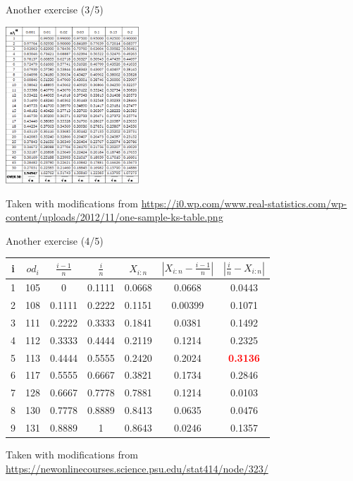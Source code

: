\documentclass{beamer}
\begin{document}
\begin{frame}
{\centerline{Another exercise (3/5)}}\label{S:TableKS}

\begin{center}
\includegraphics[width=5cm]{P2023.AIBCCSS.InferenceAndLogisticRegression/one-sample-ks-table.png}
\end{center}

\begin{center}
\tiny{Taken with modifications from \url{https://i0.wp.com/www.real-statistics.com/wp-content/uploads/2012/11/one-sample-ks-table.png}}
\end{center}
\end{frame}


\begin{frame}
{\centerline{Another exercise (4/5)}} \label{S:ComputationExercise}

\begin{center}
\begin{tabular}{|c|c|c|c|c|c|c|}
	\hline
	i & $od_i$ & $\frac{i-1}{n}$ & $\frac{i}{n}$ & $X_{i:n}$ & $|X_{i:n} - \frac{i-1}{n} |$ & $|\frac{i}{n} - X_{i:n}|$\\
	\hline
	1 & 105 & 0 & 0.1111 & 0.0668 & 0.0668 & 0.0443\\
	\hline
	2 & 108 & 0.1111 & 0.2222 & 0.1151 & 0.00399 & 0.1071\\
	\hline
	3 & 111 & 0.2222 & 0.3333 & 0.1841 & 0.0381 & 0.1492\\
	\hline
	4 & 112 & 0.3333 & 0.4444 & 0.2119 & 0.1214 & 0.2325\\
	\hline
	5 & 113 & 0.4444 & 0.5555 & 0.2420 & 0.2024 & \textcolor{red}{\bf 0.3136}\\
	\hline
	6 & 117 & 0.5555 & 0.6667 & 0.3821 & 0.1734 & 0.2846\\
	\hline
	7 & 128 & 0.6667 & 0.7778 & 0.7881 & 0.1214 & 0.0103 \\
	\hline
	8 & 130 & 0.7778 & 0.8889 & 0.8413 & 0.0635 & 0.0476\\
	\hline
	9 & 131 & 0.8889 & 1 & 0.8643 & 0.0246 & 0.1357\\
	\hline
\end{tabular}
\end{center}

\begin{center}
\tiny{Taken with modifications from \url{https://newonlinecourses.science.psu.edu/stat414/node/323/}}
\end{center}
\end{frame}
\end{document}
